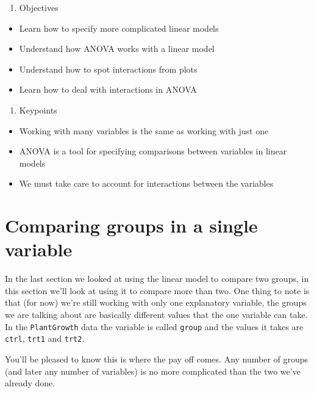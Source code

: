 \documentclass[
]{book}
\providecommand{\tightlist}{%
  \setlength{\itemsep}{0pt}\setlength{\parskip}{0pt}}
\begin{document}
\begin{enumerate}
\def\labelenumi{\arabic{enumi}.}
\setcounter{enumi}{1}
\tightlist
\item
  Objectives
\end{enumerate}

\begin{itemize}
\tightlist
\item
  Learn how to specify more complicated linear models
\item
  Understand how ANOVA works with a linear model
\item
  Understand how to spot interactions from plots
\item
  Learn how to deal with interactions in ANOVA
\end{itemize}

\begin{enumerate}
\def\labelenumi{\arabic{enumi}.}
\setcounter{enumi}{2}
\tightlist
\item
  Keypoints
\end{enumerate}

\begin{itemize}
\tightlist
\item
  Working with many variables is the same as working with just one
\item
  ANOVA is a tool for specifying comparisons between variables in linear models
\item
  We must take care to account for interactions between the variables
\end{itemize}

\hypertarget{comparing-groups-in-a-single-variable}{%
\section{Comparing groups in a single variable}\label{comparing-groups-in-a-single-variable}}

In the last section we looked at using the linear model to compare two groups, in this section we'll look at using it to compare more than two. One thing to note is that (for now) we're still working with only one explanatory variable, the groups we are talking about are basically different values that the one variable can take. In the \texttt{PlantGrowth} data the variable is called \texttt{group} and the values it takes are \texttt{ctrl}, \texttt{trt1} and \texttt{trt2}.

You'll be pleased to know this is where the pay off comes. Any number of groups (and later any number of variables) is no more complicated than the two we've already done.
\end{document}

